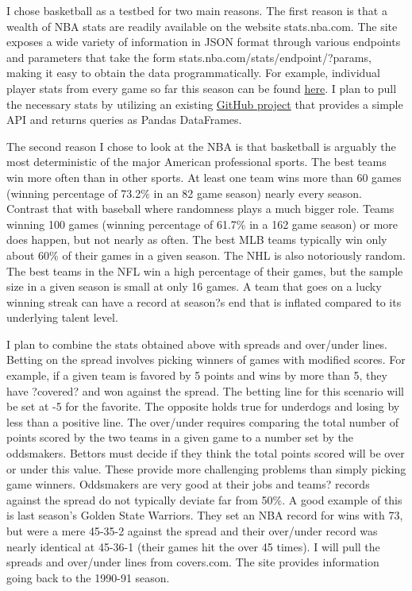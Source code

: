\documentclass{article}
\begin{document}
I chose basketball as a testbed for two main reasons. The first reason is that a wealth of NBA stats are readily available on the website stats.nba.com. The site exposes a wide variety of information in JSON format through various endpoints and parameters that take the form stats.nba.com/stats/{endpoint}/?{params}, making it easy to obtain the data programmatically. For example, individual player stats from every game so far this season can be found \href{http://stats.nba.com/stats/leaguegamelog/?LeagueID=00&Season=2016-17&SeasonType=Regular\%20Season&PlayerOrTeam=P&Sorter=PTS&Direction=DESC}{here}. I plan to pull the necessary  stats by utilizing an existing \href{https://github.com/seemethere/nba_py}{GitHub project} that provides a simple API and returns queries as Pandas DataFrames.

The second reason I chose to look at the NBA is that basketball is arguably the most deterministic of the major American professional sports. The best teams win more often than in other sports. At least one team wins more than 60 games (winning percentage of 73.2\% in an 82 game season) nearly every season. Contrast that with baseball where randomness plays a much bigger role. Teams winning 100 games (winning percentage of 61.7\% in a 162 game season) or more does happen, but not nearly as often. The best MLB teams typically win only about 60\% of their games in a given season. The NHL is also notoriously random. The best teams in the NFL win a high percentage of their games, but the sample size in a given season is small at only 16 games. A team that goes on a lucky winning streak can have a record at season?s end that is inflated compared to its underlying talent level.

I plan to combine the stats obtained above with spreads and over/under lines. Betting on the spread involves picking winners of games with modified scores. For example, if a given team is favored by 5 points and wins by more than 5, they have ?covered? and won against the spread. The betting line for this scenario will be set at -5 for the favorite. The opposite holds true for underdogs and losing by less than a positive line. The over/under requires comparing the total number of points scored by the two teams in a given game to a number set by the oddsmakers. Bettors must decide if they think the total points scored will be over or under this value. These provide more challenging problems than simply picking game winners. Oddsmakers are very good at their jobs and teams? records against the spread do not typically deviate far from 50\%. A good example of this is last season's Golden State Warriors. They set an NBA record for wins with 73, but were a mere 45-35-2 against the spread and their over/under record was nearly identical at 45-36-1 (their games hit the over 45 times). I will pull the spreads and over/under lines from covers.com. The site provides information going back to the 1990-91 season.
\end{document}
